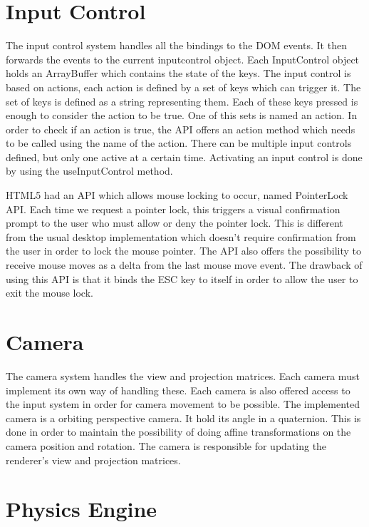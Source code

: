\section{Input Control}

The input control system handles all the bindings to the DOM events. It then forwards the events to the current inputcontrol object. 
Each InputControl object holds an ArrayBuffer which contains the state of the keys. The input control is based on actions, each action is defined by a set of keys which can trigger it. The set of keys is defined as a string representing them. Each of these keys pressed is enough to consider the action to be true. One of this sets is named an action. In order to check if an action is true, the API offers an action method which needs to be called using the name of the action. There can be multiple input controls defined, but only one active at a certain time. Activating an input control is done by using the useInputControl method. 

HTML5 had an API which allows mouse locking to occur, named PointerLock API. Each time we request a pointer lock, this triggers a visual confirmation prompt to the user who must allow or deny the pointer lock. This is different from the usual desktop implementation which doesn't require confirmation from the user in order to lock the mouse pointer.
The API also offers the possibility to receive mouse moves as a delta from the last mouse move event. The drawback of using this API is that it binds the ESC key to itself in order to allow the user to exit the mouse lock. 


\section{Camera}

The camera system handles the view and projection matrices. Each camera must implement its own way of handling these. Each camera is also offered access to the input system in order for camera movement to be possible. 
The implemented camera is a orbiting perspective camera. It hold its angle in a quaternion. This is done in order to maintain the possibility of doing affine transformations on the camera position and rotation. The camera is responsible for updating the renderer’s view and projection matrices.


\section{Physics Engine}

